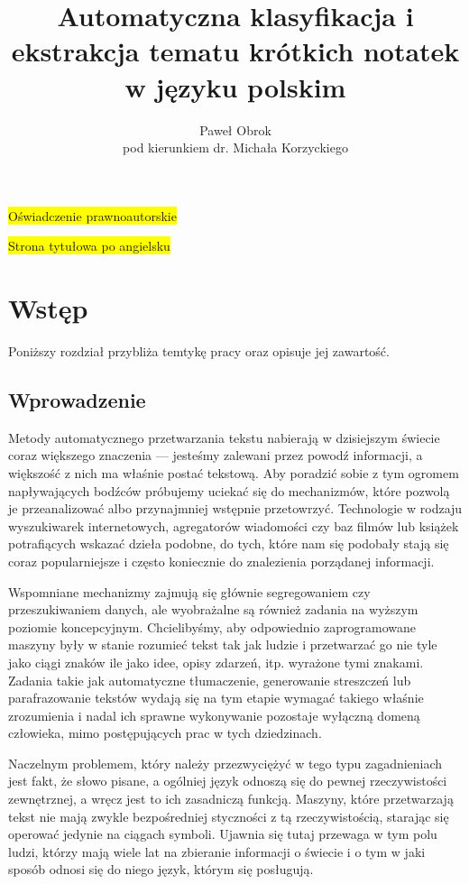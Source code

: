 \documentclass[11pt,a4paper]{article}
\newcommand{\todo}[1]{\colorbox{yellow}{#1}}
\begin{document}
\title{Automatyczna klasyfikacja i ekstrakcja tematu krótkich notatek w języku polskim}
\author{Paweł Obrok\\pod kierunkiem dr. Michała Korzyckiego}

\maketitle
\pagebreak

\todo{Oświadczenie prawnoautorskie}
\pagebreak

\todo{Strona tytułowa po angielsku}
\pagebreak

\tableofcontents
\pagebreak

\section{Wstęp}

Poniższy rozdział przybliża temtykę pracy oraz opisuje jej zawartość.

\subsection{Wprowadzenie}

Metody automatycznego przetwarzania tekstu nabierają w dzisiejszym świecie
coraz większego znaczenia --- jesteśmy zalewani przez powodź informacji, a
większość z nich ma właśnie postać tekstową. Aby poradzić sobie z tym ogromem
napływających bodźców próbujemy uciekać się do mechanizmów, które pozwolą je
przeanalizować albo przynajmniej wstępnie przetowrzyć. Technologie w rodzaju
wyszukiwarek internetowych, agregatorów wiadomości czy baz filmów lub książek
potrafiących wskazać dzieła podobne, do tych, które nam się podobały stają się
coraz popularniejsze i często koniecznie do znalezienia porządanej informacji.

Wspomniane mechanizmy zajmują się głównie segregowaniem czy przeszukiwaniem
danych, ale wyobrażalne są również zadania na wyższym poziomie koncepcyjnym.
Chcielibyśmy, aby odpowiednio zaprogramowane maszyny były w stanie rozumieć
tekst tak jak ludzie i przetwarzać go nie tyle jako ciągi znaków ile jako idee,
opisy zdarzeń, itp. wyrażone tymi znakami. Zadania takie jak automatyczne
tłumaczenie, generowanie streszczeń lub parafrazowanie tekstów wydają się na
tym etapie wymagać takiego właśnie zrozumienia i nadal ich sprawne wykonywanie
pozostaje wyłączną domeną człowieka, mimo postępujących prac w tych
dziedzinach.

Naczelnym problemem, który należy przezwyciężyć w tego typu zagadnieniach jest
fakt, że słowo pisane, a ogólniej język odnoszą się do pewnej rzeczywistości
zewnętrznej, a wręcz jest to ich zasadniczą funkcją. Maszyny, które
przetwarzają tekst nie mają zwykle bezpośredniej styczności z tą
rzeczywistością, starając się operować jedynie na ciągach symboli. Ujawnia się
tutaj przewaga w tym polu ludzi, którzy mają wiele lat na zbieranie informacji
o świecie i o tym w jaki sposób odnosi się do niego język, którym się
posługują.
\end{document}
